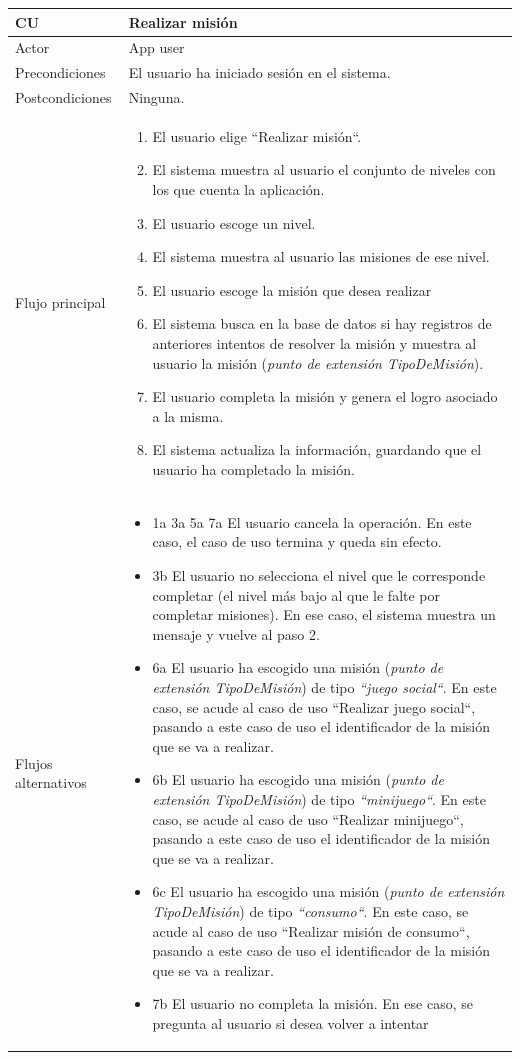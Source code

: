 \documentclass[twoside]{report}
\newcommand\addrow[2]{#1 &#2\\ }
\newcommand\addheading[2]{#1 &#2\\ \hline}
\newcommand\tabularhead{\begin{tabular}{lp{0.7\textwidth}}
\hline
}
\newenvironment{usecase}{\tabularhead}
{\hline\end{tabular}}
\begin{document}
\begin{usecase}
  \addheading{\textbf{CU\arabic{usecase}}}{Realizar misión} 
  \addrow{Actor}{App user}
  \addrow{Precondiciones}{El usuario ha iniciado sesión en el sistema.}
  \addrow{Postcondiciones}{Ninguna.}
  \addrow{Flujo principal}{
  		\begin{enumerate}
  		\item El usuario elige “Realizar misión“. %
  		\item El sistema muestra al usuario el conjunto de niveles con los que cuenta la aplicación. %
  		\item El usuario escoge un nivel. %
  		\item El sistema muestra al usuario las misiones de ese nivel. %
  		\item El usuario escoge la misión que desea realizar %
  		\item El sistema busca en la base de datos si hay registros de anteriores intentos de resolver la misión y muestra al usuario la misión (\textit{punto de extensión TipoDeMisión}). %
  		\item El usuario completa la misión y genera el logro asociado a la misma.%
  		\item El sistema actualiza la información, guardando que el usuario ha completado la misión. %
  		\end{enumerate}
  }
  \addrow{Flujos alternativos}{
  		\begin{itemize}
  		\item 1a 3a 5a 7a El usuario cancela la operación. En este caso, el caso de uso termina y queda sin efecto.
        \item 3b El usuario no selecciona el nivel que le corresponde completar (el nivel más bajo al que le falte por completar misiones). En ese caso, el sistema muestra un mensaje y vuelve al paso 2.
        
        \item 6a El usuario ha escogido una misión (\textit{punto de extensión TipoDeMisión}) de tipo \textit{“juego social“}. En este caso, se acude al caso de uso “Realizar juego social“, pasando a este caso de uso el identificador de la misión que se va a realizar.
        
        \item 6b El usuario ha escogido una misión (\textit{punto de extensión TipoDeMisión}) de tipo \textit{“minijuego“}. En este caso, se acude al caso de uso “Realizar minijuego“, pasando a este caso de uso el identificador de la misión que se va a realizar.
        
        \item 6c El usuario ha escogido una misión (\textit{punto de extensión TipoDeMisión}) de tipo \textit{“consumo“}. En este caso, se acude al caso de uso “Realizar misión de consumo“, pasando a este caso de uso el identificador de la misión que se va a realizar.
        
        \item 7b El usuario no completa la misión. En ese caso, se pregunta al usuario si desea volver a intentar
  		\end{itemize}
  }
\end{usecase}\\
\end{document}

